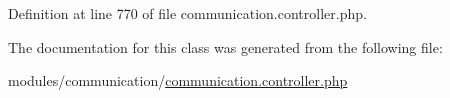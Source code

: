 Definition at line 770 of file communication.\-controller.\-php.



The documentation for this class was generated from the following file\-:\begin{DoxyCompactItemize}
\item 
modules/communication/\hyperlink{communication_8controller_8php}{communication.\-controller.\-php}\end{DoxyCompactItemize}
